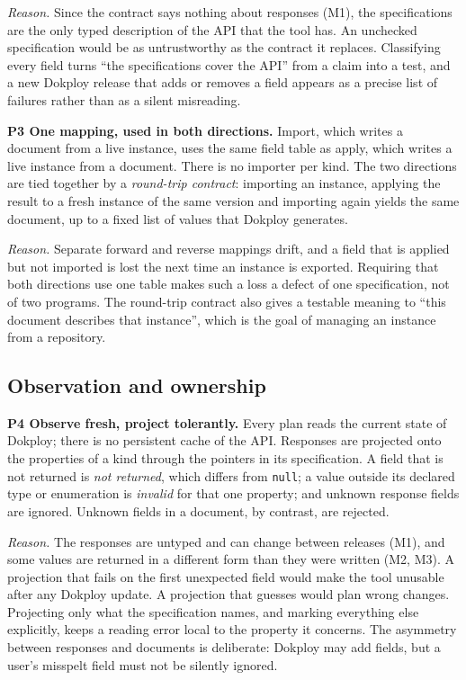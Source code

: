 \emph{Reason.} Since the contract says nothing about responses (M1), the specifications are the only
typed description of the API that the tool has. An unchecked specification would be as untrustworthy
as the contract it replaces. Classifying every field turns ``the specifications cover the API'' from a
claim into a test, and a new Dokploy release that adds or removes a field appears as a precise list of
failures rather than as a silent misreading.

\textbf{P3 One mapping, used in both directions.} Import, which writes a document from a live instance,
uses the same field table as apply, which writes a live instance from a document. There is no importer
per kind. The two directions are tied together by a \emph{round-trip contract}: importing an instance,
applying the result to a fresh instance of the same version and importing again yields the same
document, up to a fixed list of values that Dokploy generates.

\emph{Reason.} Separate forward and reverse mappings drift, and a field that is applied but not imported is
lost the next time an instance is exported. Requiring that both directions use one table makes such a
loss a defect of one specification, not of two programs. The round-trip contract also gives a testable
meaning to ``this document describes that instance'', which is the goal of managing an instance from a
repository.

\subsection{Observation and ownership}\label{sec:4.2}

\textbf{P4 Observe fresh, project tolerantly.} Every plan reads the current state of Dokploy; there is no
persistent cache of the API. Responses are projected onto the properties of a kind through the
pointers in its specification. A field that is not returned is \emph{not returned}, which differs from
\texttt{null}; a value outside its declared type or enumeration is \emph{invalid} for that one property; and
unknown response fields are ignored. Unknown fields in a document, by contrast, are rejected.

\emph{Reason.} The responses are untyped and can change between releases (M1), and some values are
returned in a different form than they were written (M2, M3). A projection that fails on the first
unexpected field would make the tool unusable after any Dokploy update. A projection that guesses
would plan wrong changes. Projecting only what the specification names, and marking everything else
explicitly, keeps a reading error local to the property it concerns. The asymmetry between responses
and documents is deliberate: Dokploy may add fields, but a user's misspelt field must not be silently
ignored.

